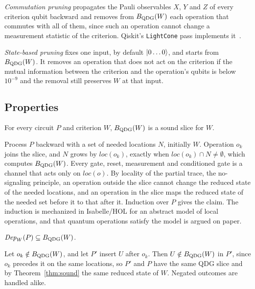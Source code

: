 \emph{Commutation pruning} propagates the Pauli observables $X$, $Y$ and $Z$ of every criterion qubit
backward and removes from $B_{\mathrm{QDG}}(W)$ each operation that commutes with all of them, since such an operation
cannot change a measurement statistic of the criterion. Qiskit's \texttt{LightCone} pass implements
it~\cite{qiskit2025}.

\emph{State-based pruning} fixes one input, by default $\lvert 0\dots0\rangle$, and starts from $B_{\mathrm{QDG}}(W)$. It
removes an operation that does not act on the criterion if the mutual information between the criterion
and the operation's qubits is below $10^{-9}$ and the removal still preserves $W$ at that input.

\subsection{Properties}

\begin{theorem}\label{thm:sound}
For every circuit $P$ and criterion $W$, $B_{\mathrm{QDG}}(W)$ is a sound slice for $W$.
\end{theorem}

\begin{IEEEproof}
Process $P$ backward with a set of needed locations $N$, initially $W$. Operation $o_k$ joins the slice,
and $N$ grows by $\mathit{loc}(o_k)$, exactly when $\mathit{loc}(o_k) \cap N \neq \emptyset$, which
computes $B_{\mathrm{QDG}}(W)$. Every gate, reset, measurement and conditioned gate is a channel that acts only on
$\mathit{loc}(o)$. By locality of the partial trace, the no-signaling principle, an operation outside the
slice cannot change the reduced state of the needed locations, and an operation in the slice maps the
reduced state of the needed set before it to that after it. Induction over $P$ gives the claim. The
induction is mechanized in Isabelle/HOL for an abstract model of local operations, and that quantum
operations satisfy the model is argued on paper.
\end{IEEEproof}

\begin{proposition}\label{prop:complete}
$\mathit{Dep}_W(P) \subseteq B_{\mathrm{QDG}}(W)$.
\end{proposition}

\begin{IEEEproof}
Let $o_k \notin B_{\mathrm{QDG}}(W)$, and let $P'$ insert $U$ after $o_k$. Then $U \notin B_{\mathrm{QDG}}(W)$ in $P'$, since
$o_k$ precedes it on the same locations, so $P'$ and $P$ have the same QDG slice and by
Theorem~\ref{thm:sound} the same reduced state of $W$. Negated outcomes are handled alike.
\end{IEEEproof}

